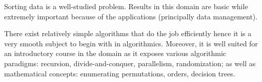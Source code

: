 \label{tree:sorting:intro}

Sorting data is a well-studied problem. Results in this domain are basic while
extremely important because of the applications (principally data management).

There exist relatively simple algorithms that do the job efficiently hence it
is a very smooth subject to begin with in algorithmics. Moreover, it is well
suited for an introductory course in the domain as it exposes various
algorithmic paradigms: recursion, divide-and-conquer, parallelism,
randomization; as well as mathematical concepts: enumerating permutations,
orders, decision trees.
